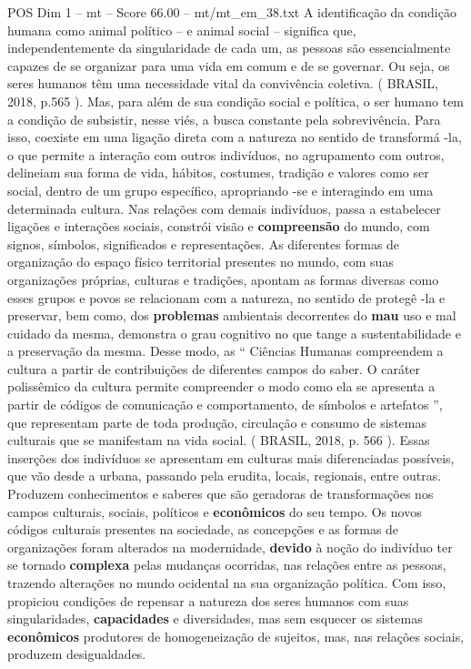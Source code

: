 \begin{textsample}{POS Dim 1 – mt – Score 66.00 – mt/mt\_em\_38.txt}
A identificação da condição humana como animal político – e animal social – significa que, independentemente da singularidade de cada um, as pessoas são essencialmente capazes de se organizar para uma vida em comum e de se governar.
Ou seja, os seres humanos têm uma necessidade vital da convivência coletiva. ( BRASIL, 2018, p.565 ).
Mas, para além de sua condição social e política, o ser humano tem a condição de subsistir, nesse viés, a busca constante pela sobrevivência.
Para isso, coexiste em uma ligação direta com a natureza no sentido de transformá -la, o que permite a interação com outros indivíduos, no agrupamento com outros, delineiam sua forma de vida, hábitos, costumes, tradição e valores como ser social, dentro de um grupo específico, apropriando -se e interagindo em uma determinada cultura.
Nas relações com demais indivíduos, passa a estabelecer ligações e interações sociais, constrói visão e \textbf{compreensão} do mundo, com signos, símbolos, significados e representações.
As diferentes formas de organização do espaço físico territorial presentes no mundo, com suas organizações próprias, culturas e tradições, apontam as formas diversas como esses grupos e povos se relacionam com a natureza, no sentido de protegê -la e preservar, bem como, dos \textbf{problemas} ambientais decorrentes do \textbf{mau} uso e mal cuidado da mesma, demonstra o grau cognitivo no que tange a sustentabilidade e a preservação da mesma.
Desse modo, as “ Ciências Humanas compreendem a cultura a partir de contribuições de diferentes campos do saber.
O caráter polissêmico da cultura permite compreender o modo como ela se apresenta a partir de códigos de comunicação e comportamento, de símbolos e artefatos ”, que representam parte de toda produção, circulação e consumo de sistemas culturais que se manifestam na vida social. ( BRASIL, 2018, p. 566 ).
Essas inserções dos indivíduos se apresentam em culturas mais diferenciadas possíveis, que vão desde a urbana, passando pela erudita, locais, regionais, entre outras.
Produzem conhecimentos e saberes que são geradoras de transformações nos campos culturais, sociais, políticos e \textbf{econômicos} do seu tempo.
Os novos códigos culturais presentes na sociedade, as concepções e as formas de organizações foram alterados na modernidade, \textbf{devido} à noção do indivíduo ter se tornado \textbf{complexa} pelas mudanças ocorridas, nas relações entre as pessoas, trazendo alterações no mundo ocidental na sua organização política.
Com isso, propiciou condições de repensar a natureza dos seres humanos com suas singularidades, \textbf{capacidades} e diversidades, mas sem esquecer os sistemas \textbf{econômicos} produtores de homogeneização de sujeitos, mas, nas relações sociais, produzem desigualdades.

\end{textsample}
